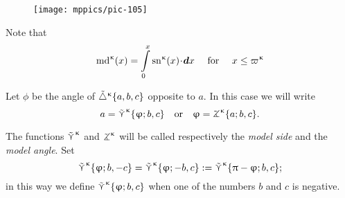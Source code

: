 \begin{wrapfigure}{r}{43mm}
\centering
\texttt{[image: mppics/pic-105]}
\end{wrapfigure}


Note that
\[
\mdk(x)=\int\limits_0^x
\snk(x)\cdot\dd x \quad \text{ for }\quad x\le \varpi\kappa
\]

Let $\phi$ be the angle of ${\tilde\triangle}^{\upkappa}\{a,b,c\}$  
opposite to $a$.
In this case we will write \label{page:model-side}\index{$\side\kappa$!$\side\kappa \{{*};{*},{*}\}$}
\[a
=
\side\kappa\{\phi;b,c\}
\quad  \text{or}\quad 
\phi
=
\tangle\mc\kappa\{a;b,c\}.\]

The functions $\side\kappa$ and $\tangle\mc\kappa$ will be called respectively the \emph{model side} and the \emph{model angle}.
Set 
\[
\mathop{\tilde\curlyvee}\nolimits^{\upkappa}\{\upvarphi;b,-c\}
=\mathop{\tilde\curlyvee}\nolimits^{\upkappa}\{\upvarphi;-b,c\}
:=\mathop{\tilde\curlyvee}\nolimits^{\upkappa}\{\uppi-\upvarphi;b,c\};\]
in this way we define $\mathop{\tilde\curlyvee}\nolimits^{\upkappa}\{\upvarphi;b,c\}$ when one of the numbers  $b$ and $c$ is negative. %


